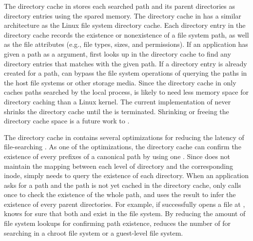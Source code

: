 The directory cache in \thelibos{} stores each searched path and its parent directories as directory entries
using the spared \picoproc{} memory.
The directory cache in \thelibos{} has a similar architecture
as the Linux file system directory cache.
Each directory entry in the directory cache records the existence or nonexistence of a file system path,
as well as the file attributes
(e.g., file types, sizes, and permissions).
If an application has given a path as a \linuxapi{} argument,
\thelibos{} first looks up
in the directory cache to find any directory entries
that matches with the given path.
If a directory entry is already created for a path, \thelibos{} can bypass the file system operations of querying the paths
in the host file systems or other storage media.
Since the directory cache in \thelibos{} only caches paths searched
by the local process,
\thelibos{} is likely to need less memory space
for directory caching than a Linux kernel.
The current implementation of \thelibos{} never shrinks the directory cache
until the \picoproc{} is terminated.
Shrinking or freeing the directory cache space
is a future work to \thelibos{}.


The directory cache in \thelibos{} contains several optimizations for reducing the latency of file-searching \linuxapis{}.
As one of the optimizations, the directory cache can confirm the existence of every prefixes
of a canonical path by using one \hostapi{}.
Since \thelibos{} does not maintain the mapping between
each level of directory and the corresponding inode,
\thelibos{} simply needs to query the existence of each directory.
When an application asks for a path
and the path is not yet cached in the directory cache,
\thelibos{} only calls  once
to check the existence
of the whole path, and uses the result to infer the existence of every parent directories.
For example, if \thelibos{} successfully opens a file at ,
\thelibos{} knows for sure that both  and  exist in the file system.
By reducing the amount of file system lookups for confirming path existence,
\thelibos{} reduces the number of \hostapis{}
for searching in a chroot file system or a guest-level file system.



